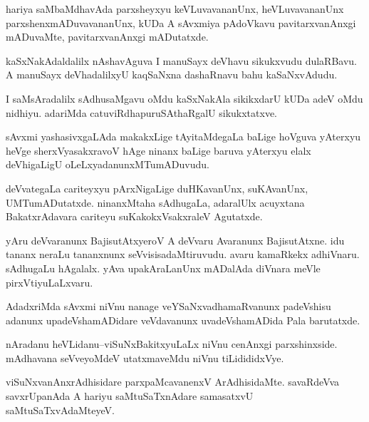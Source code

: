 \documentclass{article}
\begin{document}
\begin{mn}%
hariya saMbaMdhavAda parxsheyxyu keVLuvavananUnx, heVLuvavananUnx parxshenxmADuvavananUnx, 
kUDa A sAvxmiya pAdoVkavu pavitarxvanAnxgi mADuvaMte, pavitarxvanAnxgi mADutatxde.
\end{mn}

\begin{mn}%
kaSxNakAdaldalilx nAshavAguva I manuSayx deVhavu sikukxvudu dulaRBavu. A manuSayx 
deVhadalilxyU kaqSaNxna dashaRnavu bahu kaSaNxvAdudu.
\end{mn}

\begin{mn}%
I saMsAradalilx sAdhusaMgavu oMdu kaSxNakAla sikikxdarU kUDa adeV oMdu nidhiyu. adariMda 
catuviRdhapuruSAthaRgalU sikukxtatxve.
\end{mn}

\begin{mn}%
sAvxmi yashasivxgaLAda makakxLige tAyitaMdegaLa baLige hoVguva yAterxyu heVge 
sherxVyasakxravoV hAge ninanx baLige baruva yAterxyu elalx deVhigaLigU 
oLeLxyadanunxMTumADuvudu.
\end{mn}

\begin{mn}%
deVvategaLa cariteyxyu pArxNigaLige duHKavanUnx, suKAvanUnx, UMTumADutatxde. ninanxMtaha
sAdhugaLa, adaralUlx acuyxtana BakatxrAdavara cariteyu suKakokxVsakxraleV Agutatxde.
\end{mn}

\begin{mn}%
yAru deVvaranunx BajisutAtxyeroV A deVvaru Avaranunx BajisutAtxne. idu tananx neraLu 
tananxnunx seVvisisadaMtiruvudu. avaru kamaRkekx adhiVnaru. sAdhugaLu hAgalalx. yAva 
upakAraLanUnx mADalAda diVnara meVle pirxVtiyuLaLxvaru.
\end{mn}

\begin{mn}%
AdadxriMda sAvxmi niVnu nanage veYSaNxvadhamaRvanunx padeVshisu adanunx upadeVshamADidare 
veVdavanunx uvadeVshamADida Pala barutatxde.
\end{mn}

\begin{mn}%
nAradanu heVLidanu--viSuNxBakitxyuLaLx niVnu cenAnxgi parxshinxside. mAdhavana seVveyoMdeV 
utatxmaveMdu niVnu tiLidididxVye.
\end{mn}

\begin{mn}%
viSuNxvanAnxrAdhisidare parxpaMcavanenxV ArAdhisidaMte. savaRdeVva savxrUpanAda A hariyu 
saMtuSaTxnAdare samasatxvU saMtuSaTxvAdaMteyeV.
\end{mn}
\end{document}
